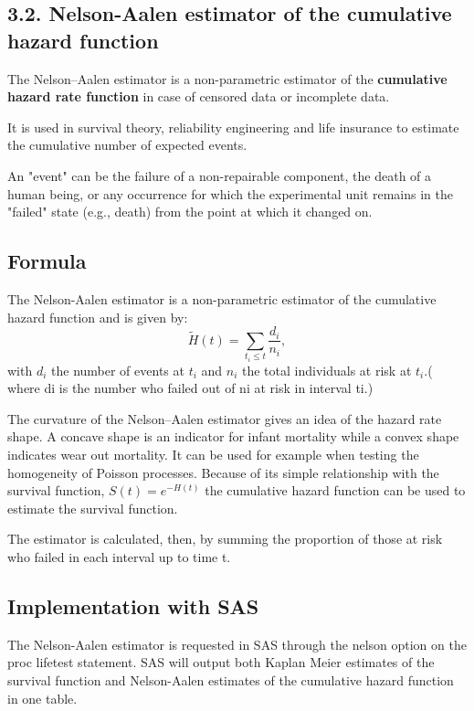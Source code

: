 \documentclass[MasterNotes.tex]{subfiles}
\begin{document}
	
\subsection*{3.2. Nelson-Aalen estimator of the cumulative hazard function}

The Nelson–Aalen estimator is a non-parametric estimator of the \textbf{cumulative hazard rate function} in case of censored data or incomplete data.


It is used in survival theory, reliability engineering and life insurance to estimate the cumulative number of expected events. 


An "event" can be the failure of a non-repairable component, the death of a human being, or any occurrence for which the experimental unit remains in the "failed" state (e.g., death) from the point at which it changed on. 

\subsection*{Formula}
The Nelson-Aalen estimator is a non-parametric estimator of the cumulative hazard function and is given by:
\[\tilde{H}(t)=\sum_{t_i\leq t}\frac{d_i}{n_i},\]
with $d_i$ the number of events at $t_i$ and $n_i$ the total individuals at risk at $t_i$.( %
where di is the number who failed out of ni at risk in interval ti.)

The curvature of the Nelson–Aalen estimator gives an idea of the hazard rate shape. A concave shape is an indicator for infant mortality while a convex shape indicates wear out mortality.
It can be used for example when testing the homogeneity of Poisson processes.
Because of its simple relationship with the survival function, $S(t)=e^{−H(t)}$ the cumulative hazard function can be used to estimate the survival function. 

 The estimator is calculated, then, by summing the proportion of those at risk who failed in each interval up to time t.

\subsection*{Implementation with SAS}
The Nelson-Aalen estimator is requested in SAS through the nelson option on the proc lifetest statement. SAS will output both Kaplan Meier estimates of the survival function and Nelson-Aalen estimates of the cumulative hazard function in one table.
\end{document}
